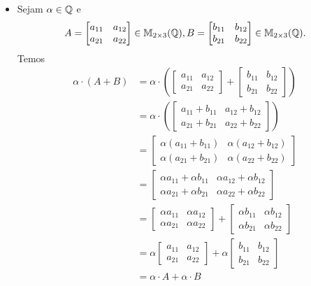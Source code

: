 \documentclass[12pt]{exam}
\begin{document}
\begin{itemize}
        \item Sejam $\alpha \in \mathbb{Q}$ e
        \[
        A = \begin{bmatrix} a_{11} & a_{12}\\a_{21} & a_{22}\end{bmatrix} \in \mathbb{M}_{2 \times 3}(\mathbb{Q}),
        B = \begin{bmatrix} b_{11} & b_{12}\\b_{21} & b_{22}\end{bmatrix} \in \mathbb{M}_{2 \times 3}(\mathbb{Q}).
        \]
        Temos
        \begin{align*}
            \alpha\cdot(A + B) & = \alpha\cdot\left(
            \begin{bmatrix} a_{11} & a_{12}\\a_{21} & a_{22}\end{bmatrix} +
            \begin{bmatrix} b_{11} & b_{12}\\b_{21} & b_{22}\end{bmatrix}\right)
            \\ &= \alpha\cdot\left(\begin{bmatrix} a_{11} + b_{11} & a_{12} + b_{12}\\a_{21} + b_{21} & a_{22} + b_{22}\end{bmatrix}\right)
            \\ &= \begin{bmatrix} \alpha(a_{11} + b_{11}) & \alpha(a_{12} + b_{12})\\\alpha(a_{21} + b_{21}) & \alpha(a_{22} + b_{22})\end{bmatrix}
            \\ &= \begin{bmatrix} \alpha a_{11} + \alpha b_{11} & \alpha a_{12} + \alpha b_{12}\\\alpha a_{21} + \alpha b_{21} & \alpha a_{22} + \alpha b_{22}\end{bmatrix}
            \\ &= \begin{bmatrix} \alpha a_{11} & \alpha a_{12}\\ \alpha a_{21} & \alpha a_{22}\end{bmatrix}
            + \begin{bmatrix} \alpha b_{11} & \alpha b_{12}\\ \alpha b_{21} & \alpha b_{22}\end{bmatrix}
            \\ &= \alpha\begin{bmatrix} a_{11} & a_{12}\\a_{21} & a_{22}\end{bmatrix} +
            \alpha\begin{bmatrix} b_{11} & b_{12}\\b_{21} & b_{22}\end{bmatrix}
            \\ &= \alpha\cdot A + \alpha\cdot B
        \end{align*}


\end{itemize}
\end{document}
